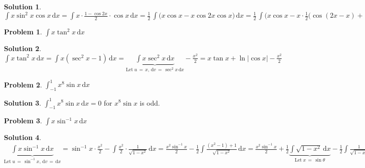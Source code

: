 \documentclass[11pt,a4paper]{article}
\newcommand{\ds}{\displaystyle}
\theoremstyle{definition}
\newtheorem*{problem}{Problem}
\newtheorem*{solution}{Solution}
\begin{document}
\begin{solution}
  $\ds\int\!x\sin^2 x\cos x\,\text{d}x = \int\!x\cdot\frac{1 - \cos 2x}{2}\cdot\cos x\,\text{d}x = \frac{1}{2}\,\int\!\big(x\cos x - x\cos 2x\cos x\big)\,\text{d}x = \frac{1}{2}\,\int\!\Big(x\cos x - x\cdot\frac{1}{2}\big(\cos (2x - x) + \cos(2x + x)\big)\Big)\,\text{d}x = \frac{1}{4}\,\int\!\big(2x\cos x - x\cos x - x\cos 3x\big)\,\text{d}x = \frac{1}{4}\,\int\!x\,(\cos x - \cos 3x)\,\text{d}x = \frac{1}{4}\,\Big(x\Big(\sin x - \frac{1}{3}\sin 3x\Big) + \cos x - \frac{1}{9}\cos 3x\Big)$
\end{solution}

\begin{problem}
  $\ds\int\!x\tan^2\!x\,\text{d}x$
\end{problem}

\begin{solution}
  $\ds\int\!x\tan^2\!x\,\text{d}x = \int\!x(\sec^2\!x - 1)\,\text{d}x = \underbrace{\int\!x\sec^2\!x\,\text{d}x}_{\text{Let}\;u\,=\,x,\,\text{d}v\,=\,\sec^2\!x\,\text{d}x} - \frac{x^2}{2} = x\tan x + \ln|\cos x| - \frac{x^2}{2}$
\end{solution}

\begin{problem}
  $\ds\int_{-1}^1\!x^8\sin x\,\text{d}x$
\end{problem}

\begin{solution}
  $\ds\int_{-1}^1\!x^8\sin x\,\text{d}x = 0$ for $x^8\sin x$ is odd.
\end{solution}

\begin{problem}
  $\ds\int\!x\sin^{-1}\!x\,\text{d}x$
\end{problem}

\begin{solution}
  $\ds\underbrace{\int\!x\sin^{-1}\!x\,\text{d}x}_{\text{Let}\;u\,=\,\sin^{-1}x,\,\text{d}v\,=\,\text{d}x} = \sin^{-1}\!x\cdot\frac{x^2}{2} - \int\!\frac{x^2}{2}\cdot\frac{1}{\sqrt{1 - x^2}}\,\text{d}x = \frac{x^2\sin^{-1}\!x}{2} - \frac{1}{2}\int\!\frac{(x^2 - 1) + 1}{\sqrt{1 - x^2}}\,\text{d}x = \frac{x^2\sin^{-1}\!x}{2} + \frac{1}{2}\underbrace{\int\!\!\sqrt{1 - x^2}\,\text{d}x}_{\text{Let}\;x\,=\,\sin\theta} - \frac{1}{2}\int\!\!\frac{1}{\sqrt{1 - x^2}}\,\text{d}x = \frac{x^2\sin^{-1}\!x}{2} + \frac{1}{2}\,\Big(\frac{\theta}{2} + \frac{1}{4}\sin2\theta\Big) - \frac{1}{2}\sin^{-1}x = \frac{x^2\sin^{-1}\!x}{2} + \frac{1}{4}\,\Big(\sin^{-1}\!x + x\sqrt{1 - x^2}\Big) - \frac{1}{2}\sin^{-1}x = \frac{x^2\sin^{-1}\!x}{2} + \frac{x\sqrt{1 - x^2}}{4} - \frac{\sin^{-1}\!x}{4}$
\end{solution}
\end{document}
